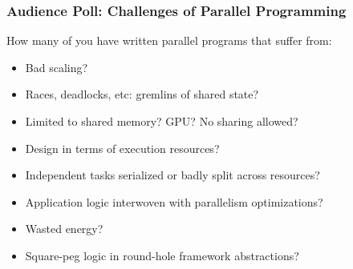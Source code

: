 \begin{frame}
\frametitle{Audience Poll: Challenges of Parallel Programming}
How many of you have written parallel programs that suffer from:
\begin{itemize}
\pause
{}
\pause
\item Bad scaling?
\item Races, deadlocks, etc: gremlins of shared state?
\pause
\item Limited to shared memory? GPU? No sharing allowed?
\pause
\item Design in terms of execution resources?
\pause
\item Independent tasks serialized or badly split across resources?
\pause
\item Application logic interwoven with parallelism optimizations?
\pause
\item Wasted energy?
\pause
\item Square-peg logic in round-hole framework abstractions?
\end{itemize}
\end{frame}
